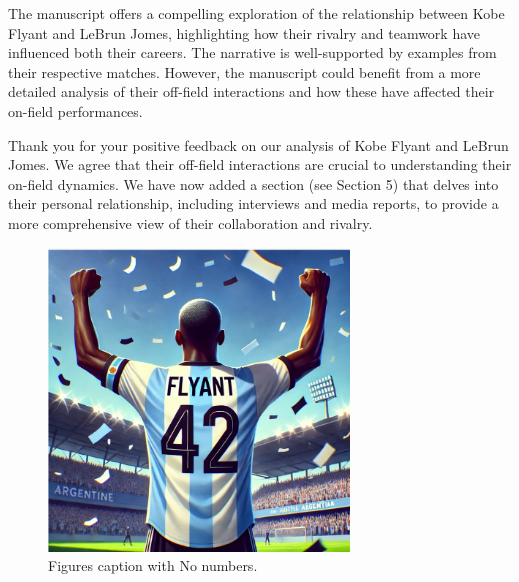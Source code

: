 \editor
\begin{generalcomment}
	The manuscript offers a compelling exploration of the relationship between Kobe Flyant and LeBrun Jomes, highlighting how their rivalry and teamwork have influenced both their careers. The narrative is well-supported by examples from their respective matches. However, the manuscript could benefit from a more detailed analysis of their off-field interactions and how these have affected their on-field performances.	
\end{generalcomment}
\begin{revmeta}Thank you for your positive feedback on our analysis of Kobe Flyant and LeBrun Jomes. We agree that their off-field interactions are crucial to understanding their on-field dynamics. We have now added a section (see Section 5) that delves into their personal relationship, including interviews and media reports, to provide a more comprehensive view of their collaboration and rivalry.
	\begin{figure}[!ht]
		\centering
		\includegraphics[width=8cm]{Man42.png}
		\caption*{Figures caption with No numbers.}
		\label{Figure}
	\end{figure}
	

\end{revmeta}
